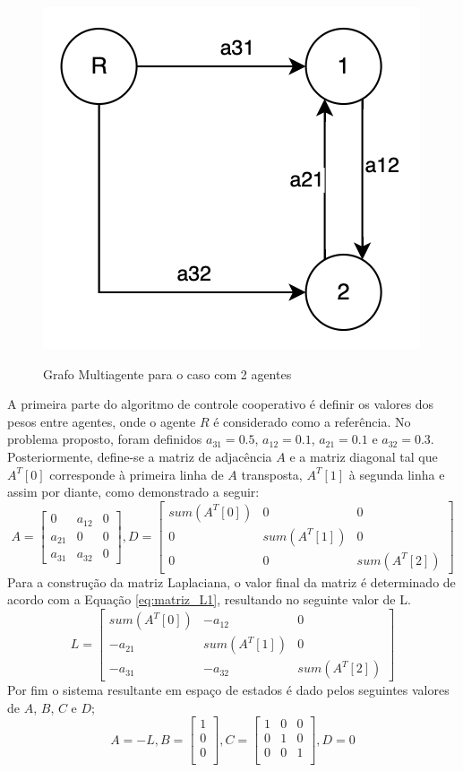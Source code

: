 \begin{figure}[ht]
\centering
\caption{Grafo Multiagente para o caso com 2 agentes}
\includegraphics[width=0.3\linewidth]{figures/Simulation/Simples/grafo_simple_case.png}
\label{fig:grafo_simple_case}
\end{figure}

A primeira parte do algoritmo de controle cooperativo é definir os valores dos pesos entre agentes, onde o agente \( R \) é considerado como a referência. No problema proposto, foram definidos \( a_{31} = 0.5 \), \( a_{12} = 0.1 \), \( a_{21} = 0.1 \) e \( a_{32} = 0.3 \). Posteriormente, define-se a matriz de adjacência \( A \) e a matriz diagonal tal que \( A^T[0] \) corresponde à primeira linha de \( A \) transposta, \( A^T[1] \) à segunda linha e assim por diante, como demonstrado a seguir:
\[
A = \begin{bmatrix}
0 & a_{12} & 0 \\
a_{21} & 0 & 0 \\
a_{31} & a_{32} & 0
\end{bmatrix} ,
D = \begin{bmatrix}
sum(A^{T}[0]) & 0 & 0 \\
0 & sum(A^{T}[1]) & 0 \\
0 & 0 & sum(A^{T}[2])
\end{bmatrix}
\]
Para a construção da matriz Laplaciana, o valor final da matriz é determinado de acordo com a Equação \ref{eq:matriz_L1}, resultando no seguinte valor de L.
\[
L = \begin{bmatrix}
    sum(A^{T}[0]) & -a_{12} & 0 \\
    -a_{21} & sum(A^{T}[1]) & 0 \\
    -a_{31} & -a_{32} & sum(A^{T}[2])
    \end{bmatrix}
\]
Por fim o sistema resultante em espaço de estados é dado pelos seguintes valores de $A$, $B$, $C$ e $D$;
\[
A = -L 
 , 
 B = \begin{bmatrix}
    1\\
    0\\
    0\\
\end{bmatrix}
 ,
C = \begin{bmatrix}
    1 & 0 & 0\\
    0 & 1 & 0\\
    0 & 0 & 1\\
\end{bmatrix}
 ,
D = 0
\]
